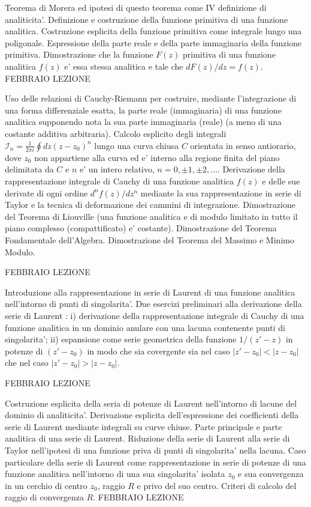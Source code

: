 \documentclass[,12pt]{article}
\begin{document}
\noindent
Teorema di Morera ed ipotesi di questo teorema come IV definizione di
analiticita'. Definizione e costruzione della funzione primitiva di una
funzione analitica. Costruzione esplicita della funzione primitiva come
integrale lungo una poligonale. Espressione della parte reale e della
parte immaginaria della funzione primitiva. Dimostrazione che la funzione
$F(z)$ primitiva di una funzione analitica $f(z)$ e' essa stessa
analitica e tale che $dF(z)/dz=f(z)$.
\vskip 20pt
 FEBBRAIO
\hskip 20pt
LEZIONE

\noindent
Uso delle relazioni di Cauchy-Riemann per costruire, mediante
l'integrazione di una forma differenziale esatta, la parte reale
(immaginaria) di una funzione analitica supponendo nota la sua parte
immaginaria (reale) (a meno di una costante additiva arbitraria). Calcolo
esplicito degli integrali $\mathcal{I}_n=\frac{1}{2\pi i}\oint
dz(z-z_0)^n$ lungo una curva chiusa $C$ orientata in senso antiorario,
dove $z_0$ non appartiene alla curva ed e' interno alla regione finita
del piano delimitata da $C$ e $n$ e' un intero relativo,
$n=0,\pm1,\pm2,\dots$. Derivazione della rappresentazione integrale di
Cauchy di una funzione analitica $f(z)$ e delle sue derivate di ogni
ordine $d^n f(z)/dz^n$ mediante la sua rappresentazione in serie di
Taylor e la tecnica di deformazione dei cammini di integrazione.
Dimostrazione del Teorema di Liouville (una funzione analitica e
di modulo limitato in tutto il piano complesso (compattificato) e'
costante). Dimostrazione del Teorema Fondamentale dell'Algebra.
Dimostrazione del Teorema del Massimo e Minimo Modulo. 

\vskip 20pt
 FEBBRAIO
\hskip 20pt
LEZIONE

\noindent
Introduzione alla rappresentazione in serie di Laurent di una funzione
analitica nell'intorno di punti di singolarita'. Due esercizi
preliminari alla derivazione della serie di Laurent : i) derivazione
della rappresentazione integrale di Cauchy di una funzione analitica in
un dominio anulare con una lacuna contenente punti di singolarita'; ii)
espansione come serie geometrica della funzione $1/(z'-z)$ in potenze di
$(z'-z_0)$ in modo che sia covergente sia nel caso $|z'-z_0|<|z-z_0|$
che nel caso $|z'-z_0|>|z-z_0|$.  
 

\vskip 20pt
 FEBBRAIO
\hskip 20pt
LEZIONE

\noindent
Costruzione esplicita della seria di potenze di Laurent nell'intorno di
lacune del dominio di analiticita'. Derivazione esplicita
dell'espressione dei coefficienti della serie di Laurent mediante
integrali su curve chiuse. Parte principale e parte analitica di una
serie di Laurent. Riduzione della serie di Laurent alla serie di Taylor
nell'ipotesi di una funzione priva di punti di singolarita' nella
lacuna. Caso particolare della serie di Laurent come rappresentazione in
serie di potenze di una funzione analitica nell'intorno di una sua
singolarita' isolata $z_0$ e sua convergenza in un cerchio di centro
$z_0$, raggio $R$ e privo del suo centro. Criteri di calcolo del raggio
di convergenza $R$.
\vskip 20pt
 FEBBRAIO
\hskip 20pt
LEZIONE
\end{document}

